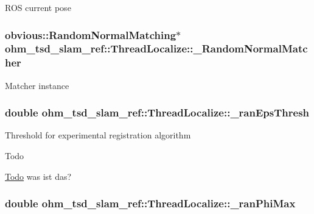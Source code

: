 R\-O\-S current pose \hypertarget{classohm__tsd__slam__ref_1_1ThreadLocalize_a527f8668ebe51a6bc7cadba7075c8c3f}{
\subsubsection[{\-\_\-\-Random\-Normal\-Matcher}]{\setlength{\rightskip}{0pt plus 5cm}obvious\-::\-Random\-Normal\-Matching$\ast$ ohm\-\_\-tsd\-\_\-slam\-\_\-ref\-::\-Thread\-Localize\-::\-\_\-\-Random\-Normal\-Matcher\hspace{0.3cm}{\ttfamily [private]}}}\label{classohm__tsd__slam__ref_1_1ThreadLocalize_a527f8668ebe51a6bc7cadba7075c8c3f}
Matcher instance \hypertarget{classohm__tsd__slam__ref_1_1ThreadLocalize_a2e9f4af9a78a5c16b1a4966b1e28a27b}{
\subsubsection[{\-\_\-ran\-Eps\-Thresh}]{\setlength{\rightskip}{0pt plus 5cm}double ohm\-\_\-tsd\-\_\-slam\-\_\-ref\-::\-Thread\-Localize\-::\-\_\-ran\-Eps\-Thresh\hspace{0.3cm}{\ttfamily [private]}}}\label{classohm__tsd__slam__ref_1_1ThreadLocalize_a2e9f4af9a78a5c16b1a4966b1e28a27b}
Threshold for experimental registration algorithm \begin{DoxyRefDesc}{Todo}
\item[\hyperlink{todo__todo000020}{Todo}]was ist das? \end{DoxyRefDesc}
\hypertarget{classohm__tsd__slam__ref_1_1ThreadLocalize_a5ab8f03d41a726e561c95be6d6f090a7}{
\subsubsection[{\-\_\-ran\-Phi\-Max}]{\setlength{\rightskip}{0pt plus 5cm}double ohm\-\_\-tsd\-\_\-slam\-\_\-ref\-::\-Thread\-Localize\-::\-\_\-ran\-Phi\-Max\hspace{0.3cm}{\ttfamily [private]}}}\label{classohm__tsd__slam__ref_1_1ThreadLocalize_a5ab8f03d41a726e561c95be6d6f090a7}
